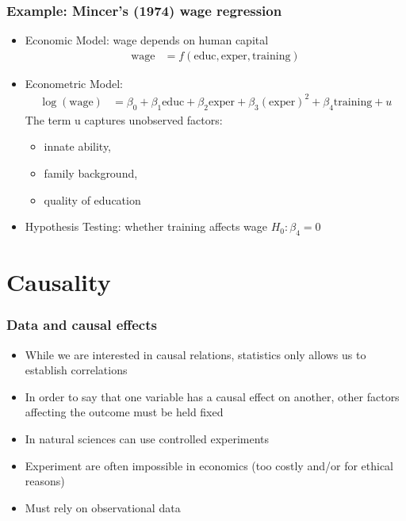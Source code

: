 \begin{frame}[allowframebreaks]\frametitle{Example: Mincer's (1974) wage regression}
  \begin{itemize}
  \item Economic Model: wage depends on human capital
    \begin{align*}
    \mathrm{wage} &= f \left(\mathrm{educ}, \mathrm{exper},\mathrm{training}
    \right) 
     \end{align*}
  \item Econometric Model: 
    \begin{align*}
    \log(\mathrm{wage}) &= \beta_0 + \beta_1 \mathrm{educ} + \beta_2 \mathrm{exper}
    + \beta_3 (\mathrm{exper})^2 + \beta_4 \mathrm{training} +u 
     \end{align*}
    The term u captures unobserved factors:
    \begin{itemize}
    \item innate ability, 
    \item family background, 
    \item  quality of education
    \end{itemize}
  \item Hypothesis Testing: whether training affects wage $H_0 : \beta_4 = 0$
  \end{itemize}
\end{frame}
\section{Causality}

\begin{frame}[allowframebreaks]\frametitle{Data and causal effects}
  \begin{itemize}
  \item While we are interested in causal relations, statistics only allows us
    to establish correlations 
  \item In order to say that one variable has a causal effect on
    another, other factors affecting the outcome must be held
    fixed 
  \item In natural sciences can use controlled experiments
  \item Experiment are often impossible in economics (too costly
    and/or for ethical reasons)
  \item Must rely on observational data
  \end{itemize}
\end{frame}

